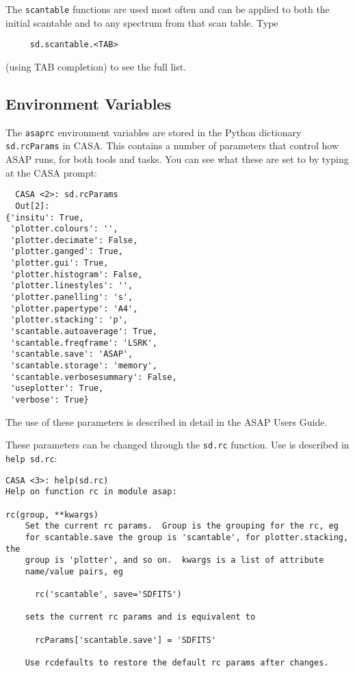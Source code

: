 The {\tt scantable} functions are used most often and can be applied
to both the initial scantable and to any spectrum from that scan
table.  Type
\small
\begin{verbatim}
     sd.scantable.<TAB>
\end{verbatim}
\normalsize
(using TAB completion) to see the full list. 



\subsection{Environment Variables}
\label{subsection:sd.asap.environ}

The {\tt asaprc} environment variables are stored in the Python
dictionary {\tt sd.rcParams} in CASA.  This contains a number
of parameters that control how ASAP runs, for both tools and
tasks.  You can see what these are set to by typing at the
CASA prompt:

\small
\begin{verbatim}
  CASA <2>: sd.rcParams
  Out[2]: 
{'insitu': True,
 'plotter.colours': '',
 'plotter.decimate': False,
 'plotter.ganged': True,
 'plotter.gui': True,
 'plotter.histogram': False,
 'plotter.linestyles': '',
 'plotter.panelling': 's',
 'plotter.papertype': 'A4',
 'plotter.stacking': 'p',
 'scantable.autoaverage': True,
 'scantable.freqframe': 'LSRK',
 'scantable.save': 'ASAP',
 'scantable.storage': 'memory',
 'scantable.verbosesummary': False,
 'useplotter': True,
 'verbose': True}
\end{verbatim}
\normalsize

The use of these parameters is described in detail in the
ASAP Users Guide.

These parameters can be changed through the {\tt sd.rc}
function.  Use is described in {\tt help sd.rc}:

\small
\begin{verbatim}
CASA <3>: help(sd.rc)
Help on function rc in module asap:

rc(group, **kwargs)
    Set the current rc params.  Group is the grouping for the rc, eg
    for scantable.save the group is 'scantable', for plotter.stacking, the
    group is 'plotter', and so on.  kwargs is a list of attribute
    name/value pairs, eg
    
      rc('scantable', save='SDFITS')
    
    sets the current rc params and is equivalent to
    
      rcParams['scantable.save'] = 'SDFITS'
    
    Use rcdefaults to restore the default rc params after changes.
\end{verbatim}
\normalsize

